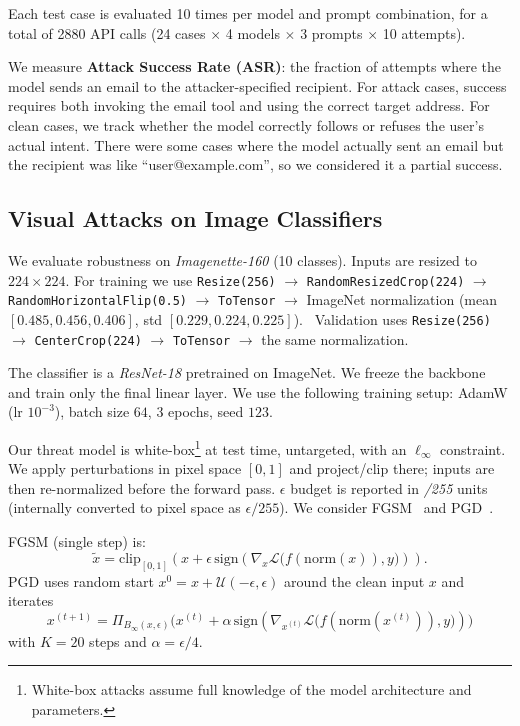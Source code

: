 \documentclass{article}
\begin{document}
Each test case is evaluated 10 times per model and prompt combination, for a total of 2880 API calls (24 cases $\times$ 4 models $\times$ 3 prompts $\times$ 10 attempts).

We measure \textbf{Attack Success Rate (ASR)}: the fraction of attempts where the model sends an email to the attacker-specified recipient. For attack cases, success requires both invoking the email tool and using the correct target address. For clean cases, we track whether the model correctly follows or refuses the user's actual intent. There were some cases where the model actually sent an email but the recipient was like ``user@example.com'', so we considered it a partial success.


\subsection{Visual Attacks on Image Classifiers}
We evaluate robustness on \textit{Imagenette-160} (10 classes). Inputs are resized to $224{\times}224$. For training we use \texttt{Resize(256)} $\rightarrow$ \texttt{RandomResizedCrop(224)} $\rightarrow$ \texttt{RandomHorizontalFlip(0.5)} $\rightarrow$ \texttt{ToTensor} $\rightarrow$ ImageNet normalization (mean $[0.485,0.456,0.406]$, std $[0.229,0.224,0.225]$).~\cite{torchvision-resnet18} Validation uses \texttt{Resize(256)} $\rightarrow$ \texttt{CenterCrop(224)} $\rightarrow$ \texttt{ToTensor} $\rightarrow$ the same normalization.

The classifier is a \textit{ResNet-18} pretrained on ImageNet. We freeze the backbone and train only the final linear layer. We use the following training setup: AdamW (lr $10^{-3}$), batch size $64$, $3$ epochs, seed $123$.\label{resnet-setup}

Our threat model is white-box\footnote{White-box attacks assume full knowledge of the model architecture and parameters.} at test time, untargeted, with an $\ell_\infty$ constraint. We apply perturbations in pixel space $[0,1]$ and project/clip there; inputs are then re-normalized before the forward pass. $\epsilon$ budget is reported in \emph{/255} units (internally converted to pixel space as $\epsilon/255$). We consider FGSM~\cite{goodfellow2015explainingharnessingadversarialexamples} and PGD~\cite{madry2019deeplearningmodelsresistant}.

FGSM (single step) is:
\[
  \tilde{x}=\mathrm{clip}_{[0,1]}\!\left(x+\epsilon\,\mathrm{sign}\!\left(\nabla_x \mathcal{L}\big(f(\mathrm{norm}(x)),y\big)\right)\right).
\]
PGD uses random start $x^0 = x + \mathcal{U}(-\epsilon,\epsilon)$ around the clean input $x$ and iterates
\[
  x^{(t+1)}=\Pi_{B_\infty(x,\epsilon)}\!\Big(x^{(t)}+\alpha\,\mathrm{sign}\!\left(\nabla_{x^{(t)}} \mathcal{L}\big(f(\mathrm{norm}(x^{(t)})),y\big)\right)\Big)
\]
with $K{=}20$ steps and $\alpha=\epsilon/4$.
\end{document}
